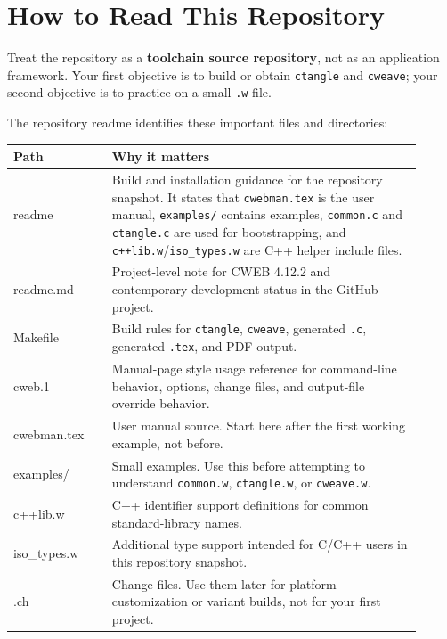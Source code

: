 \documentclass[11pt]{article}
\begin{document}
\section{How to Read This Repository}

Treat the repository as a \textbf{toolchain source repository}, not as an application framework. Your first objective is to build or obtain \texttt{ctangle} and \texttt{cweave}; your second objective is to practice on a small \texttt{.w} file.

The repository readme identifies these important files and directories:

\begin{longtable}{>{\ttfamily}p{0.22\linewidth} p{0.69\linewidth}}
\toprule
\normalfont\textbf{Path} & \textbf{Why it matters} \\
\midrule
readme & Build and installation guidance for the repository snapshot. It states that \texttt{cwebman.tex} is the user manual, \texttt{examples/} contains examples, \texttt{common.c} and \texttt{ctangle.c} are used for bootstrapping, and \texttt{c++lib.w}/\texttt{iso\_types.w} are C++ helper include files. \cite{repo-readme} \\
readme.md & Project-level note for CWEB 4.12.2 and contemporary development status in the GitHub project. \cite{repo-readme-md} \\
Makefile & Build rules for \texttt{ctangle}, \texttt{cweave}, generated \texttt{.c}, generated \texttt{.tex}, and PDF output. \cite{repo-makefile} \\
cweb.1 & Manual-page style usage reference for command-line behavior, options, change files, and output-file override behavior. \cite{repo-manpage} \\
cwebman.tex & User manual source. Start here after the first working example, not before. \cite{repo-readme} \\
examples/ & Small examples. Use this before attempting to understand \texttt{common.w}, \texttt{ctangle.w}, or \texttt{cweave.w}. \cite{repo-readme} \\
c++lib.w & C++ identifier support definitions for common standard-library names. \cite{repo-readme,repo-cpplib} \\
iso\_types.w & Additional type support intended for C/C++ users in this repository snapshot. \cite{repo-readme} \\
*.ch & Change files. Use them later for platform customization or variant builds, not for your first project. \cite{repo-readme,repo-manpage} \\
\bottomrule
\end{longtable}
\end{document}
